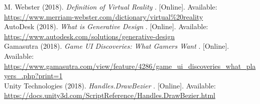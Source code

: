 \documentclass[draftclsnofoot,onecolumn,compsoc]{IEEEtran}
\begin{document}
\newpage

\listoffigures


\begin{thebibliography}{9}

M. Webster (2018). 
\textit{Definition of Virtual Reality} 
. [Online]. Available: 
\\\url{https://www.merriam-webster.com/dictionary/virtual\%20reality}
\\

AutoDesk (2018). 
\textit{What is Generative Design} 
. [Online]. Available: 
\\\url{https://www.autodesk.com/solutions/generative-design}
\\

Gamasutra (2018). 
\textit{Game UI Discoveries: What Gamers Want} 
. [Online]. Available: 
\\\url{https://www.gamasutra.com/view/feature/4286/game_ui_discoveries_what_players_.php?print=1}
\\

Unity Technologies (2018). 
\textit{Handles.DrawBezier} 
. [Online]. Available: 
\\\url{https://docs.unity3d.com/ScriptReference/Handles.DrawBezier.html}
\\

\end{thebibliography}
\end{document}
